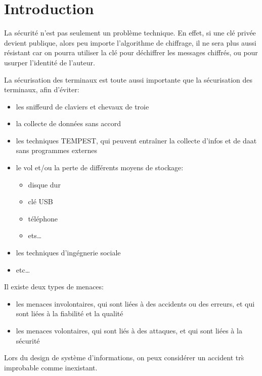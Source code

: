 \section{Introduction}
La s\'ecurit\'e n'est pas seulement un probl\`eme technique. En effet, si une cl\'e priv\'ee devient publique, alors
peu importe l'algorithme de chiffrage, il ne sera plus aussi r\'esistant car on pourra utiliser la cl\'e pour
d\'echiffrer les messages chiffr\'es, ou pour usurper l'identit\'e de l'auteur.

La s\'ecurisation des terminaux est toute aussi importante que la s\'ecurisation des terminaux, afin d'\'eviter:
\begin{itemize}
  \item les sniffeurd de claviers et chevaux de troie
  \item la collecte de donn\'ees sans accord
  \item les techniques TEMPEST, qui peuvent entra\^iner la collecte d'infos et de daat sans programmes externes
  \item le vol et/ou la perte de diff\'erents moyens de stockage:
  \begin{itemize}
    \item disque dur
    \item cl\'e USB
    \item t\'el\'ephone
    \item ets\dots
  \end{itemize}
  \item les techniques d'ing\'egnerie sociale
  \item etc\dots
\end{itemize}

Il existe deux types de menaces:
\begin{itemize}
  \item les menaces involontaires, qui sont li\'ees \`a des accidents ou des erreurs, et qui sont li\'ees \`a la
  fiabilit\'e et la qualit\'e
  \item les menaces volontaires, qui sont li\'es \`a des attaques, et qui sont li\'ees \`a la s\'ecurit\'e
\end{itemize}

Lors du design de syst\`eme d'informations, on peux consid\'erer un accident tr\`s improbable comme inexistant.


